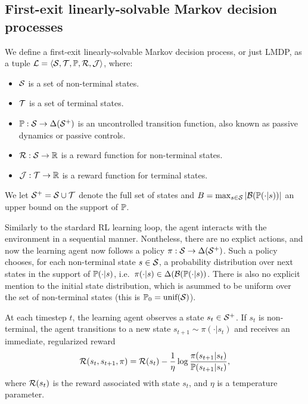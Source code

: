 \subsection{First-exit linearly-solvable Markov decision processes}

We define a first-exit linearly-solvable Markov decision process, or just LMDP, as a tuple $\mathcal{L}=\langle\mathcal{S},\mathcal{T},\mathbb{P},\mathcal{R},\mathcal{J}\rangle$, where: \begin{itemize}
  \item $\mathcal{S}$ is a set of non-terminal states.
  \item $\mathcal{T}$ is a set of terminal states.
  \item $\mathbb{P}:\mathcal{S}\rightarrow\Delta(\mathcal{S}^+)$ is an uncontrolled transition function, also known as passive dynamics or passive controls.
  \item $\mathcal{R}:\mathcal{S}\rightarrow\mathbb{R}$ is a reward function for non-terminal states.
  \item $\mathcal{J}:\mathcal{T}\rightarrow\mathbb{R}$ is a reward function for terminal states.
\end{itemize}

\noindent We let $\mathcal{S}^+=\mathcal{S}\cup\mathcal{T}$ denote the full set of states and $B=\max_{s\in\mathcal{S}}|\mathcal{B}(\mathbb{P}(\cdot|s))|$ an upper bound on the support of $\mathbb{P}$. 

Similarly to the stardard RL learning loop, the agent interacts with the environment in a sequential manner. Nontheless, there are no explict actions, and now the learning agent now follows a policy $\pi:\mathcal{S}\rightarrow\Delta(\mathcal{S}^+)$. Such a policy chooses, for each non-terminal state $s\in\mathcal{S}$, a probability distribution over next states in the support of $\mathbb{P}(\cdot|s)$, i.e.~$\pi(\cdot|s)\in\Delta(\mathcal{B}(\mathbb{P}(\cdot|s))$. There is also no explicit mention to the initial state distribution, which is asummed to be uniform over the set of non-terminal states (this is $\mathbb{P}_0 = \text{unif}(\mathcal{S})$). 

At each timestep $t$, the learning agent observes a state $s_t\in\mathcal{S}^+$. If $s_t$ is non-terminal, the agent transitions to a new state $s_{t+1}\sim\pi(\cdot|s_t)$ and receives an immediate, regularized reward
\[
\mathcal{R}(s_t, s_{t+1},\pi) = \mathcal{R}(s_t) - \frac 1 \eta \log \frac {\pi(s_{t+1}|s_t)} {\mathbb{P}(s_{t+1}|s_t)},
\] 
where $\mathcal{R}(s_t)$ is the reward associated with state $s_t$, and $\eta$ is a temperature parameter. 

